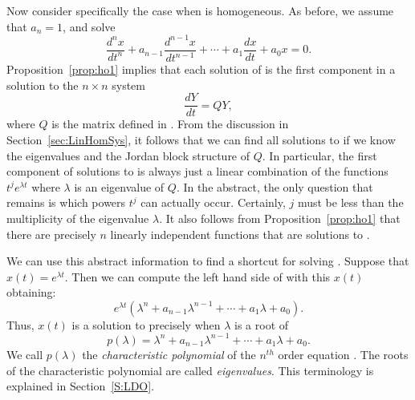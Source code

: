 \documentclass{ximera}
\begin{document}
Now consider specifically the case when  is homogeneous.  
As before, we assume that $a_n=1$, and solve
\begin{equation}  \label{eq:nconsthom}
\frac{d^nx}{dt^n} + a_{n-1}\frac{d^{n-1}x}{dt^{n-1}} +
\cdots + a_1\frac{dx}{dt}+a_0x = 0.
\end{equation}
Proposition~\ref{prop:ho1} implies that each solution
of  is the first component in a solution
to the $n\times n$ system 
\begin{equation}  \label{eq:highrwh}
\frac{dY}{dt} = QY,
\end{equation}
where $Q$ is the matrix defined in .  From the discussion 
in Section~\ref{sec:LinHomSys}, it follows that we can find all solutions 
to  if we know the eigenvalues and the 
Jordan block 
structure of $Q$.  In particular, the first component of solutions to 
 is always just a linear combination of the 
functions 
$t^je^{\lambda t}$ where $\lambda$ is an eigenvalue of $Q$.  In the 
abstract, the only question that remains is which powers $t^j$ can 
actually occur.  Certainly, $j$ must be less than the multiplicity of the 
eigenvalue $\lambda$.  It also follows from Proposition~\ref{prop:ho1}
that there are precisely $n$ linearly independent functions that are 
solutions to .

We can use this abstract information to find a shortcut for solving 
.  Suppose that $x(t)=e^{\lambda t}$.  Then we can 
compute the left hand side of  with this $x(t)$ 
obtaining:
\begin{equation}  \label{e:elam}
e^{\lambda t}\left(\lambda^n + a_{n-1}\lambda^{n-1}+\cdots+a_1\lambda
+a_0\right).
\end{equation}
Thus, $x(t)$ is a solution to  precisely when $\lambda$
is a root of 
\begin{equation} \label{E:charpoly}
p(\lambda) = \lambda^n + a_{n-1}\lambda^{n-1}+\cdots+a_1\lambda +a_0.
\end{equation}
We call $p(\lambda)$ the {\em characteristic polynomial\/}
 of the $n^{th}$ 
order equation .  The roots of the characteristic polynomial
are called {\em eigenvalues\/}.   
This terminology is explained in Section~\ref{S:LDO}.
 
\end{document}
